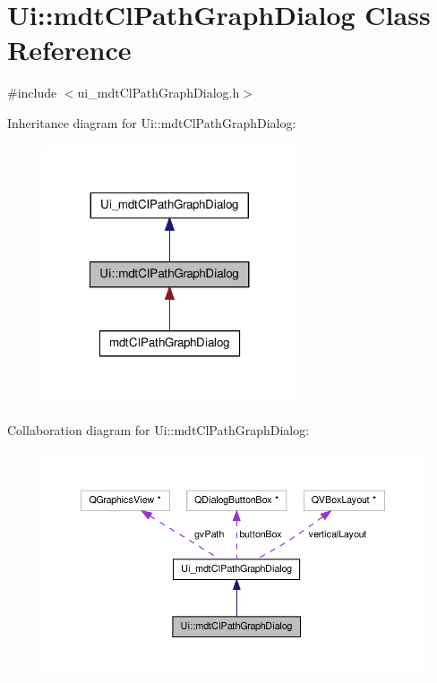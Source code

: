 \hypertarget{class_ui_1_1mdt_cl_path_graph_dialog}{\section{Ui\-:\-:mdt\-Cl\-Path\-Graph\-Dialog Class Reference}
\label{class_ui_1_1mdt_cl_path_graph_dialog}
}


{\ttfamily \#include $<$ui\-\_\-mdt\-Cl\-Path\-Graph\-Dialog.\-h$>$}



Inheritance diagram for Ui\-:\-:mdt\-Cl\-Path\-Graph\-Dialog\-:\nopagebreak
\begin{figure}[H]
\begin{center}
\leavevmode
\includegraphics[width=212pt]{class_ui_1_1mdt_cl_path_graph_dialog__inherit__graph}
\end{center}
\end{figure}


Collaboration diagram for Ui\-:\-:mdt\-Cl\-Path\-Graph\-Dialog\-:\nopagebreak
\begin{figure}[H]
\begin{center}
\leavevmode
\includegraphics[width=350pt]{class_ui_1_1mdt_cl_path_graph_dialog__coll__graph}
\end{center}
\end{figure}
